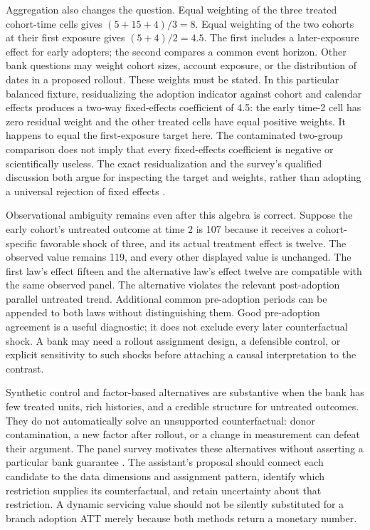 Aggregation also changes the question. Equal weighting of the three treated
cohort-time cells gives $(5+15+4)/3=8$. Equal weighting of the two cohorts at
their first exposure gives $(5+4)/2=4.5$. The first includes a later-exposure
effect for early adopters; the second compares a common event horizon. Other
bank questions may weight cohort sizes, account exposure, or the distribution
of dates in a proposed rollout. These weights must be stated. In this particular
balanced fixture, residualizing the adoption indicator against cohort and
calendar effects produces a two-way fixed-effects coefficient of 4.5: the
early time-2 cell has zero residual weight and the other treated cells have
equal positive weights. It happens to equal the first-exposure target here.
The contaminated two-group comparison does not imply that every fixed-effects
coefficient is negative or scientifically useless. The exact residualization
and the survey's qualified discussion both argue for inspecting the target and
weights, rather than adopting a universal rejection of fixed effects
\citep{panelreview2024,exec14_workflow_oracle}.

Observational ambiguity remains even after this algebra is correct. Suppose
the early cohort's untreated outcome at time 2 is 107 because it receives a
cohort-specific favorable shock of three, and its actual treatment effect
is twelve. The observed value remains 119, and every other displayed value is
unchanged. The first law's effect fifteen and the alternative law's effect
twelve are compatible with the same observed panel. The alternative violates
the relevant post-adoption parallel untreated trend. Additional common
pre-adoption periods can be appended to both laws without distinguishing
them. Good pre-adoption agreement is a useful diagnostic; it does not exclude
every later counterfactual shock. A bank may need a rollout assignment design,
a defensible control, or explicit sensitivity to such shocks before attaching
a causal interpretation to the contrast.

Synthetic control and factor-based alternatives are substantive when the
bank has few treated units, rich histories, and a credible structure for
untreated outcomes. They do not automatically solve an unsupported
counterfactual: donor contamination, a new factor after rollout, or a change
in measurement can defeat their argument. The panel survey motivates these
alternatives without asserting a particular bank guarantee
\citep{panelreview2024}. The assistant's proposal should connect each candidate
to the data dimensions and assignment pattern, identify which restriction
supplies its counterfactual, and retain uncertainty about that restriction.
A dynamic servicing value should not be silently substituted for a branch
adoption ATT merely because both methods return a monetary number.

